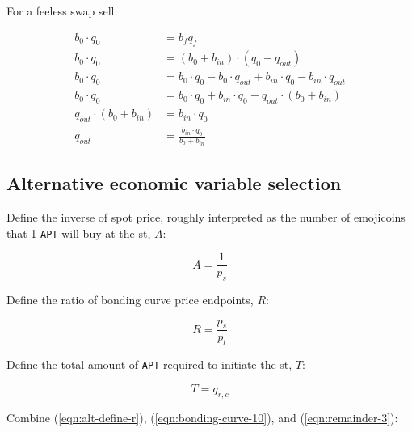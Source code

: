 \documentclass[table, twocolumn]{article}
\begin{document}
For a feeless swap sell:

\begin{align}
  b_0 \cdot q_0               & = b_f q_f \nonumber                              \\
  b_0 \cdot q_0               & = (b_0 + b_{in}) \cdot (q_0 - q_{out}) \nonumber \\
  b_0 \cdot q_0               & = b_0 \cdot q_0 - b_0 \cdot q_{out} +
  b_{in} \cdot q_0 - b_{in} \cdot q_{out} \nonumber                              \\
  b_0 \cdot q_0               & = b_0 \cdot q_0 + b_{in} \cdot q_0 -
  q_{out} \cdot(b_0 + b_{in}) \nonumber                                          \\
  q_{out} \cdot(b_0 + b_{in}) & = b_{in} \cdot q_0 \nonumber                     \\
  q_{out}                     & = \frac{b_{in} \cdot q_0}{b_0 + b_{in}}
\end{align}

\subsection{Alternative economic variable selection} \label{sec:alt-vars}

Define the inverse of spot price, roughly interpreted as the number of emojicoins that 1
\texttt{APT} will buy at the \gls*{st}, $A$:

\begin{equation} \label{eqn:alt-define-a}
  A = \frac{1}{p_s}
\end{equation}

Define the ratio of bonding curve price endpoints, $R$:

\begin{equation} \label{eqn:alt-define-r}
  R = \frac{p_s}{p_l}
\end{equation}

Define the total amount of \texttt{APT} required to initiate the \gls*{st}, $T$:

\begin{equation} \label{eqn:alt-define-t}
  T = q_{r, c}
\end{equation}

Combine (\ref{eqn:alt-define-r}), (\ref{eqn:bonding-curve-10}), and
(\ref{eqn:remainder-3}):
\end{document}

